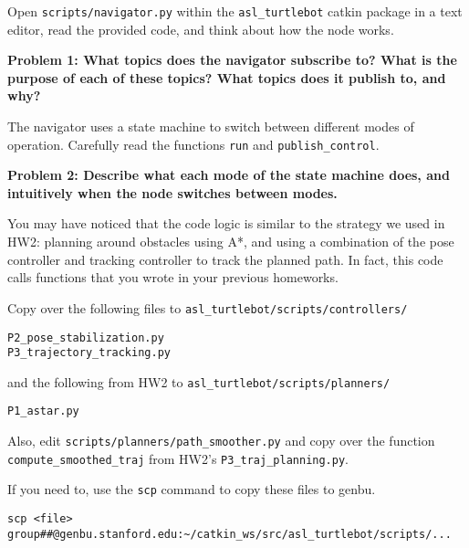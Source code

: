 \documentclass{article}
\begin{document}



Open \texttt{scripts/navigator.py} within the \texttt{asl\_turtlebot} catkin package in a text editor, read the provided code, and think about how the node works.

\textbf{Problem 1: What topics does the navigator subscribe to? What is the purpose of each of these topics? What topics does it publish to, and why?}

The navigator uses a state machine to switch between different modes of operation. Carefully read the functions \texttt{run} and \texttt{publish\_control}.

\textbf{Problem 2: Describe what each mode of the state machine does, and intuitively when the node switches between modes.}

You may have noticed that the code logic is similar to the strategy we used in HW2: planning around obstacles using A*, and using a combination of the pose controller and tracking controller to track the planned path. In fact, this code calls functions that you wrote in your previous homeworks. 

Copy over the following files to \texttt{asl\_turtlebot/scripts/controllers/}

\begin{verbatim}
P2_pose_stabilization.py
P3_trajectory_tracking.py
\end{verbatim}

and the following from HW2 to \texttt{asl\_turtlebot/scripts/planners/}

\begin{verbatim}
P1_astar.py
\end{verbatim}

Also, edit \texttt{scripts/planners/path\_smoother.py} and copy over the function \texttt{compute\_smoothed\_traj} from HW2's \texttt{P3\_traj\_planning.py}.

If you need to, use the \texttt{scp} command to copy these files to genbu.

\begin{verbatim}
scp <file> group##@genbu.stanford.edu:~/catkin_ws/src/asl_turtlebot/scripts/...
\end{verbatim}
\end{document}
